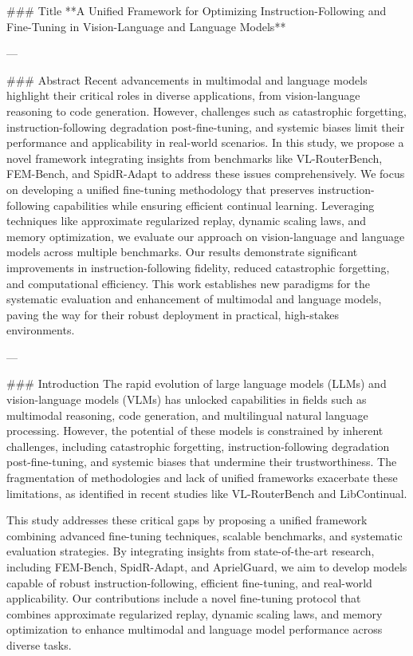 ### Title
**A Unified Framework for Optimizing Instruction-Following and Fine-Tuning in Vision-Language and Language Models**

---

### Abstract
Recent advancements in multimodal and language models highlight their critical roles in diverse applications, from vision-language reasoning to code generation. However, challenges such as catastrophic forgetting, instruction-following degradation post-fine-tuning, and systemic biases limit their performance and applicability in real-world scenarios. In this study, we propose a novel framework integrating insights from benchmarks like VL-RouterBench, FEM-Bench, and SpidR-Adapt to address these issues comprehensively. We focus on developing a unified fine-tuning methodology that preserves instruction-following capabilities while ensuring efficient continual learning. Leveraging techniques like approximate regularized replay, dynamic scaling laws, and memory optimization, we evaluate our approach on vision-language and language models across multiple benchmarks. Our results demonstrate significant improvements in instruction-following fidelity, reduced catastrophic forgetting, and computational efficiency. This work establishes new paradigms for the systematic evaluation and enhancement of multimodal and language models, paving the way for their robust deployment in practical, high-stakes environments.

---

### Introduction
The rapid evolution of large language models (LLMs) and vision-language models (VLMs) has unlocked capabilities in fields such as multimodal reasoning, code generation, and multilingual natural language processing. However, the potential of these models is constrained by inherent challenges, including catastrophic forgetting, instruction-following degradation post-fine-tuning, and systemic biases that undermine their trustworthiness. The fragmentation of methodologies and lack of unified frameworks exacerbate these limitations, as identified in recent studies like VL-RouterBench and LibContinual.

This study addresses these critical gaps by proposing a unified framework combining advanced fine-tuning techniques, scalable benchmarks, and systematic evaluation strategies. By integrating insights from state-of-the-art research, including FEM-Bench, SpidR-Adapt, and AprielGuard, we aim to develop models capable of robust instruction-following, efficient fine-tuning, and real-world applicability. Our contributions include a novel fine-tuning protocol that combines approximate regularized replay, dynamic scaling laws, and memory optimization to enhance multimodal and language model performance across diverse tasks.

